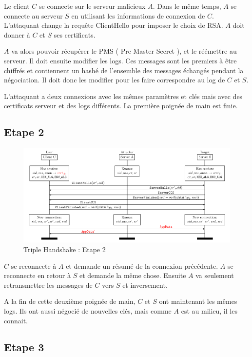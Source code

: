 Le client $C$ se connecte sur le serveur malicieux $A$. Dans le même temps, $A$ se connecte au serveur $S$ en utilisant
les informations de connexion de $C$. L'attaquant change la requête ClientHello pour imposer le choix de RSA. $A$
doit donner à $C$ et $S$ ses certificats.

$A$ va alors pouvoir récupérer le PMS ( Pre Master Secret ), et le réémettre au serveur. Il doit ensuite modifier
les logs. Ces messages sont les premiers à être chiffrés et contiennent un hashé de l'ensemble 
des messages échangés pendant la négociation. Il doit donc les modifier pour les faire correspondre au log de $C$ et $S$.

L'attaquant a deux connexions avec les mêmes paramètres et clés mais avec des certificats serveur et des logs 
différents. La première poignée de main est finie.

\subsection{Etape 2}
\label{sec:e2}

\begin{figure}[h]
\label{fig:hand2}
\centering
\includegraphics[scale=0.5]{Hand2}
\caption{Triple Handshake : Etape 2}
\end{figure}

$C$ se reconnecte à $A$ et demande un résumé de la connexion précédente. $A$ se reconnecte en retour à $S$ et demande la même chose.
Ensuite $A$ va seulement retransmettre les messages de $C$ vers $S$ et inversement.

A la fin de cette deuxième poignée de main, $C$ et $S$ ont maintenant les mêmes logs. Ils ont aussi négocié de
nouvelles clés, mais comme $A$ est au milieu, il les connait. 
\pagebreak

\subsection{Etape 3}
\label{sec:e3}

